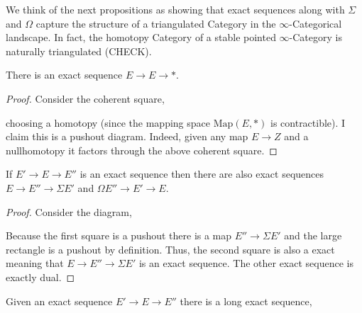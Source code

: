 \documentclass[12pt]{extarticle}
\begin{document}
\begin{rmk}
We think of the next propositions as showing that exact sequences along with $\Sigma$ and $\Omega$ capture the structure of a triangulated Category in the $\infty$-Categorical landscape. In fact, the homotopy Category of a stable pointed $\infty$-Category is naturally triangulated (CHECK).
\end{rmk}

\begin{prop}
There is an exact sequence $E \to E \to *$.
\end{prop}

\begin{proof}
Consider the coherent square,
\begin{center}
\end{center}
choosing a homotopy (since the mapping space $\mathrm{Map}(E, *)$ is contractible). I claim this is a pushout diagram. Indeed, given any map $E \to Z$ and a nullhomotopy it factors through the above coherent square.
\end{proof}

\begin{prop}
If $E' \to E \to E''$ is an exact sequence then there are also exact sequences $E \to E'' \to \Sigma E'$ and $\Omega E'' \to E' \to E$.
\end{prop}

\begin{proof}
Consider the diagram,
\begin{center}
\end{center}
Because the first square is a pushout there is a map $E'' \to \Sigma E'$ and the large rectangle is a pushout by definition. Thus, the second square is also a exact meaning that $E \to E'' \to \Sigma E'$ is an exact sequence. The other exact sequence is exactly dual.
\end{proof}

\begin{prop}
Given an exact sequence $E' \to E \to E''$ there is a long exact sequence,
\begin{center}
\end{center} 
\end{prop}
\end{document}
